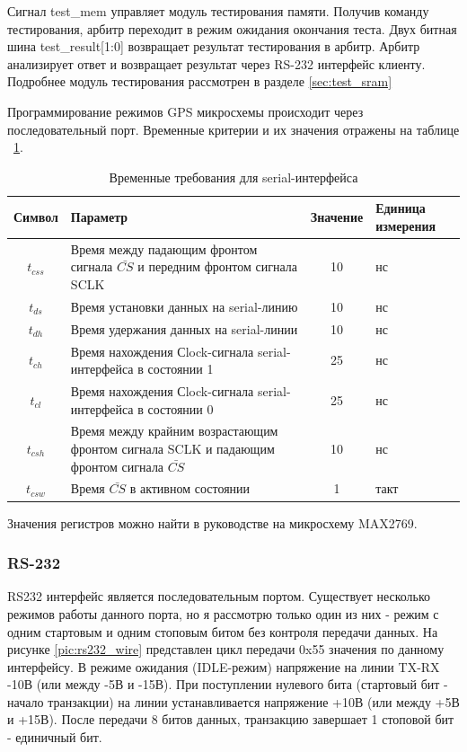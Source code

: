 Сигнал test\_mem управляет модуль тестирования памяти. Получив команду тестирования, арбитр переходит в режим ожидания окончания теста.
Двух битная шина test\_result[1:0] возвращает результат тестирования в арбитр. Арбитр анализирует ответ и возвращает результат 
через RS-232 интерфейс клиенту. Подробнее модуль тестирования рассмотрен в разделе \ref{sec:test_sram}

Программирование режимов GPS микросхемы происходит через последовательный порт. Временные критерии и их значения
отражены на таблице ~\ref{tab:gps_serial}.


\begin{table}[h]
\caption{Временные требования для serial-интерфейса}
\label{tab:gps_serial}
\begin{tabular}{|c|p{250pt}|c|p{70pt}|}
 \hline  
  Символ & Параметр & Значение & Единица измерения  \\  
 \hline  
  $t_{css}$  & Время между падающим фронтом сигнала $\bar {CS}$ и передним фронтом сигнала SCLK	& 10 & нс  \\  
 \hline  
  $t_{ds}$   & Время установки данных на serial-линию	& 10 & нс \\  
 \hline  
  $t_{dh}$   & Время удержания данных на serial-линии	& 10 & нс \\  
 \hline  
  $t_{ch}$   & Время нахождения Сlock-сигнала serial-интерфейса в состоянии 1 & 25 & нс \\  
 \hline  
  $t_{cl}$   & Время нахождения Сlock-сигнала serial-интерфейса в состоянии 0 & 25 & нс \\  
 \hline  
  $t_{csh}$  & Время между крайним возрастающим фронтом сигнала SCLK и падающим фронтом сигнала $\bar {CS}$ & 10 & нс \\  
 \hline  
  $t_{csw}$  & Время $\bar {CS}$ в активном состоянии    & 1 & такт \\  
 \hline  
\end{tabular}
\end{table}

Значения регистров можно найти в руководстве на микросхему MAX2769.

\subsubsection*{RS-232}
\label{sec:rs232}
RS232 интерфейс является последовательным портом. Существует несколько режимов работы данного порта, но я рассмотрю только один
из них - режим с одним стартовым и одним стоповым битом без контроля передачи данных. На рисунке \ref{pic:rs232_wire} представлен
цикл передачи 0x55 значения по данному интерфейсу. В режиме ожидания (IDLE-режим) напряжение на линии TX-RX -10В (или между -5В и -15В).
При поступлении нулевого бита (стартовый бит - начало транзакции) на линии устанавливается напряжение +10В (или между +5В и +15В).
После передачи 8 битов данных, транзакцию завершает 1 стоповой бит - единичный бит.

